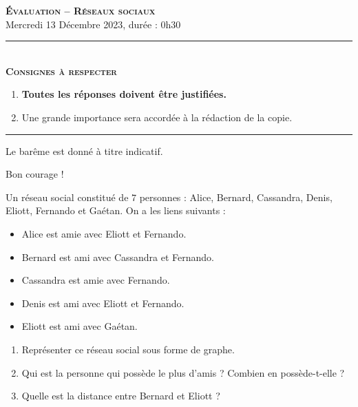 \documentclass[11pt]{article}
\begin{document}
\begin{center}
\textbf{\LARGE \textsc{Évaluation -- Réseaux sociaux}}\\[2mm]

{\large Mercredi 13 Décembre 2023, durée : 0h30}\\[1mm]
\noindent\rule{8cm}{0.4pt}\\[1mm]
\textbf{\textsc{Consignes à respecter}}
\begin{enumerate}[label=\textbf{\arabic*/}]
\item \textbf{Toutes les réponses doivent être justifiées.}
\item Une grande importance sera accordée à la rédaction de la
  copie.
\end{enumerate}
\noindent\rule{12cm}{0.4pt}
\end{center}

\vspace{2mm}
\noindent Le barême est donné à titre indicatif.
\vspace{2mm}
\begin{center}
  Bon courage !
\end{center}

\begin{exo}[$3$ points]
  Un réseau social constitué de $7$ personnes : Alice, Bernard, Cassandra,
  Denis, Eliott, Fernando et Gaétan. On a les liens suivants :
  \begin{itemize}
    \item Alice est amie avec Eliott et Fernando.
    \item Bernard est ami avec Cassandra et Fernando.
    \item Cassandra est amie avec Fernando.
    \item Denis est ami avec Eliott et Fernando.
    \item Eliott est ami avec Gaétan.
  \end{itemize}
  \begin{enumerate}
    \item Représenter ce réseau social sous forme de graphe.
    \item Qui est la personne qui possède le plus d'amis ? Combien en
      possède-t-elle ?
    \item Quelle est la distance entre Bernard et Eliott ?
  \end{enumerate}
\end{exo}
\end{document}

